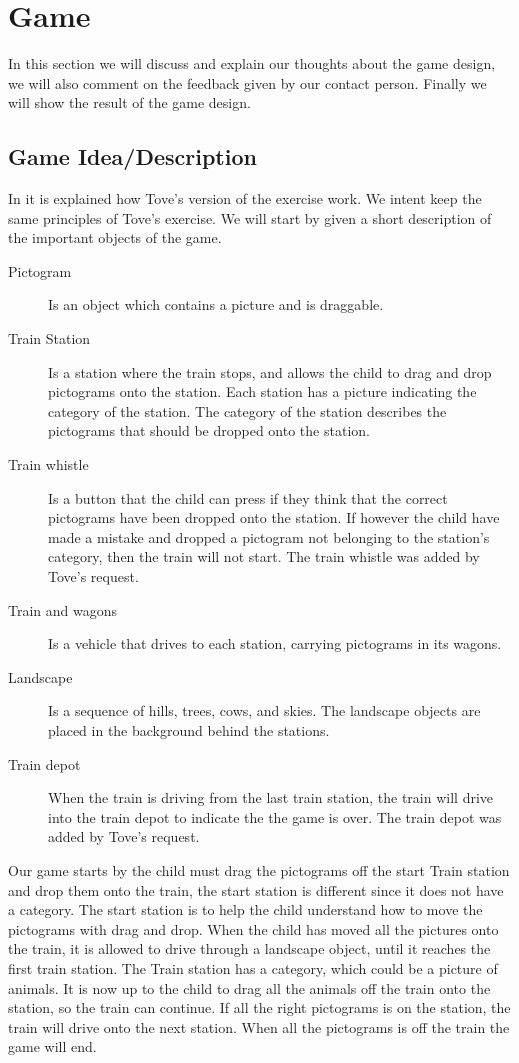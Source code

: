 \section{Game}
In this section we will discuss and explain our thoughts about the game design, we will also comment on the feedback given by our contact person. Finally we will show the result of the game design.
\subsection{Game Idea/Description}\label{sec:gameidea}
In  it is explained how Tove's version of the exercise work. We intent keep the same principles of Tove's exercise. We will start by given a short description of the important objects of the game.
\begin{description}
\item[Pictogram] Is an object which contains a picture and is draggable.
\item[Train Station] Is a station where the train stops, and allows the child to drag and drop pictograms onto the station. Each station has a picture indicating the category of the station. The category of the station describes the pictograms that should be dropped onto the station.  

\item[Train whistle] Is a button that the child can press if they think that the correct pictograms have been dropped onto the station. If however the child have made a mistake and dropped a pictogram not belonging to the station's category, then the train will not start. The train whistle was added by Tove's request.

\item[Train and wagons] Is a vehicle that drives to each station, carrying pictograms in its wagons.

\item[Landscape] Is a sequence of hills, trees, cows, and skies. The landscape objects are placed in the background behind the stations.

\item[Train depot] When the train is driving from the last train station, the train will drive into the train depot to indicate the the game is over. The train depot was added by Tove's request.
\end{description}
Our game starts by the child must drag the pictograms off the start Train station and drop them onto the train, the start station is different since it does not have a category. The start station is to help the child understand how to move the pictograms with drag and drop. When the child has moved all the pictures onto the train, it is allowed to drive through a landscape object, until it reaches the first train station.
The Train station has a category, which could be a picture of animals. It is now up to the child to drag all the animals off the train onto the station, so the train can continue. If all the right pictograms is on the station, the train will drive onto the next station. When all the pictograms is off the train the game will end.

